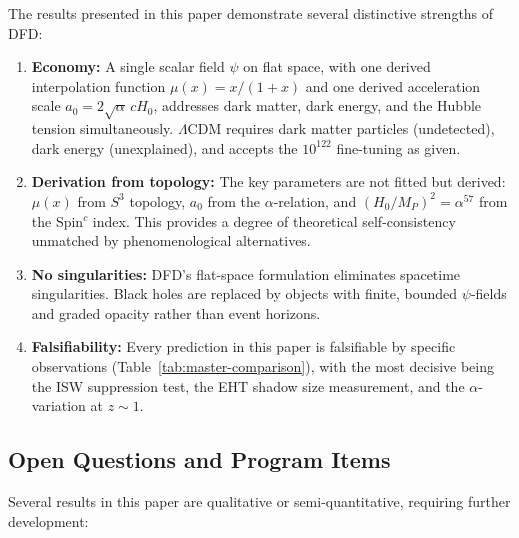 \documentclass[aps,prd,twocolumn,superscriptaddress,nofootinbib]{revtex4-2}
\begin{document}
The results presented in this paper demonstrate several distinctive
strengths of DFD:

\begin{enumerate}
\item \textbf{Economy:} A single scalar field $\psi$ on flat space,
  with one derived interpolation function $\mu(x) = x/(1+x)$ and
  one derived acceleration scale $a_0 = 2\sqrt{\alpha}\,cH_0$,
  addresses dark matter, dark energy, and the Hubble tension
  simultaneously. $\Lambda$CDM requires dark matter particles
  (undetected), dark energy (unexplained), and accepts the
  $10^{122}$ fine-tuning as given.

\item \textbf{Derivation from topology:} The key parameters are not
  fitted but derived: $\mu(x)$ from $S^3$ topology, $a_0$ from
  the $\alpha$-relation, and $(H_0/M_P)^2 = \alpha^{57}$ from the
  Spin$^c$ index. This provides a degree of theoretical
  self-consistency unmatched by phenomenological alternatives.

\item \textbf{No singularities:} DFD's flat-space formulation
  eliminates spacetime singularities. Black holes are replaced by
  objects with finite, bounded $\psi$-fields and graded opacity
  rather than event horizons.

\item \textbf{Falsifiability:} Every prediction in this paper is
  falsifiable by specific observations (Table~\ref{tab:master-comparison}),
  with the most decisive being the ISW suppression test, the EHT
  shadow size measurement, and the $\alpha$-variation at $z \sim 1$.
\end{enumerate}

\subsection{Open Questions and Program Items}

Several results in this paper are qualitative or semi-quantitative,
requiring further development:
\end{document}
